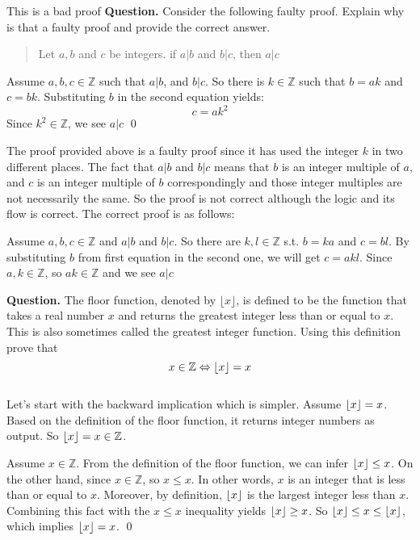 \begin{example}{This is a bad proof}
	\textbf{Question.} Consider the following faulty proof. Explain why is that a faulty proof and provide the correct answer.
	\begin{quote}
		\centering
		Let $ a,b $ and $ c $ be integers. if $ a|b $ and $ b|c $, then $ a|c $ \\
	\end{quote}

	
	 Assume $ a,b,c \in \mathbb{Z} $ such that $ a|b $, and $ b|c $. So there is $ k \in \mathbb{Z} $ such that $ b=ak $ and $ c=bk $. Substituting $ b $ in the second equation yields:
	\[c  = ak^2\]
	Since $ k^2 \in \mathbb{Z} $, we see $ a|c $ \qed \newline
	
	 The proof provided above is a faulty proof since it has used the integer $ k $ in two different places. The fact that $ a|b $ and $ b|c $ means that $ b $ is an integer multiple of $ a $, and $ c $ is an integer multiple of $ b $ correspondingly and those integer multiples are not necessarily the same. So the proof is not correct although the logic and its flow is correct. The correct proof is as follows:
	
	 Assume $ a,b,c \in \mathbb{Z}$ and $ a|b $ and $ b|c $. So there are $ k,l \in \mathbb{Z} $ s.t. $ b=ka $ and $ c=bl $. By substituting $ b $ from first equation in the second one, we will get $ c=akl $. Since $ a,k \in \mathbb{Z} $, so $ ak \in \mathbb{Z} $ and we see $ a|c $
	
\end{example}

\begin{example}{}
	\textbf{Question.} The floor function, denoted by $ \lfloor x \rfloor $, is defined to be the function that takes a real number $ x $ and returns the greatest integer less than or equal to $ x $. This is also sometimes called the greatest integer function. Using this definition prove that
	\[ x \in \mathbb{Z} \Leftrightarrow \lfloor x \rfloor = x \] \\
	
	 Let's start with the backward implication which is simpler. Assume $ \lfloor x \rfloor = x $. Based on the definition of the floor function, it returns integer numbers as output. So $ \lfloor x \rfloor = x \in \mathbb{Z} $.
	
	 Assume $ x \in \mathbb{Z} $. From the definition of the floor function, we can infer $ \lfloor x \rfloor \leq x $. On the other hand, since $ x \in \mathbb{Z} $, so $ x \leq x $. In other words, $ x $ is an integer that is less than or equal to $ x $. Moreover, by definition, $ \lfloor x \rfloor $ is the largest integer less than $ x $. Combining this fact with the $ x \leq x $ inequality yields $ \lfloor x \rfloor \geq x $. So $ \lfloor x \rfloor \leq x \leq \lfloor x \rfloor $, which implies $ \lfloor x \rfloor = x $. \qed
	
\end{example}


